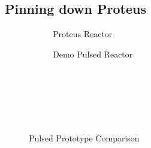 \begin{table}[h!]
\begin{subtable}[t]{0.5\textwidth}
\begin{tabular}{ c|c }
\end{tabular}
\end{subtable}
\hfill
\hfill
\end{table}

\newpage 

\subsection{Pinning down Proteus}

\begin{figure*}[h!]
    \centering
    \hfill 
    \begin{subfigure}[t]{0.45\textwidth}
        \centering
    \begin{adjustbox}{width=\textwidth}
      \Large
      
    \end{adjustbox}
        \caption{Proteus Reactor}
    \end{subfigure}
    \hfill
    \begin{subfigure}[t]{0.45\textwidth}
        \centering
    \begin{adjustbox}{width=\textwidth}
      \Large
      
    \end{adjustbox}
        \caption{Demo Pulsed Reactor}
    \end{subfigure}
    \hfill \hfill ~\\ ~\\ ~\\
    \caption{Pulsed Prototype Comparison} ~\\
\end{figure*}


